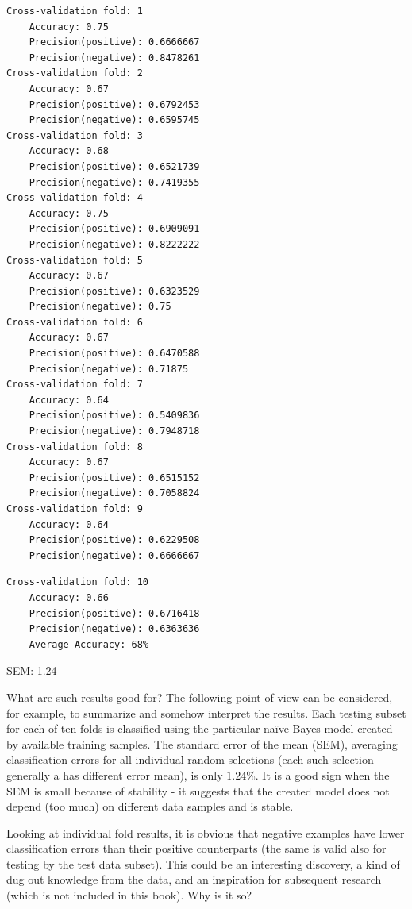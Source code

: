 \documentclass[11pt,openany,executivepaper]{book}
\begin{document}
\begin{verbatim}
Cross-validation fold: 1
    Accuracy: 0.75
    Precision(positive): 0.6666667
    Precision(negative): 0.8478261
Cross-validation fold: 2
    Accuracy: 0.67
    Precision(positive): 0.6792453
    Precision(negative): 0.6595745
Cross-validation fold: 3
    Accuracy: 0.68
    Precision(positive): 0.6521739
    Precision(negative): 0.7419355
Cross-validation fold: 4
    Accuracy: 0.75
    Precision(positive): 0.6909091
    Precision(negative): 0.8222222
Cross-validation fold: 5
    Accuracy: 0.67
    Precision(positive): 0.6323529
    Precision(negative): 0.75
Cross-validation fold: 6
    Accuracy: 0.67
    Precision(positive): 0.6470588
    Precision(negative): 0.71875
Cross-validation fold: 7
    Accuracy: 0.64
    Precision(positive): 0.5409836
    Precision(negative): 0.7948718
Cross-validation fold: 8
    Accuracy: 0.67
    Precision(positive): 0.6515152
    Precision(negative): 0.7058824
Cross-validation fold: 9
    Accuracy: 0.64
    Precision(positive): 0.6229508
    Precision(negative): 0.6666667
\end{verbatim}

\begin{verbatim}
Cross-validation fold: 10
    Accuracy: 0.66
    Precision(positive): 0.6716418
    Precision(negative): 0.6363636
    Average Accuracy: 68%
\end{verbatim}

SEM: 1.24

What are such results good for? The following point of view can be considered, for example, to summarize and somehow interpret the results. Each testing subset for each of ten folds is classified using the particular naïve Bayes model created by available training samples. The standard error of the mean (SEM), averaging classification errors for all individual random selections (each such selection generally a has different error mean), is only $1.24 \%$. It is a good sign when the SEM is small because of stability - it suggests that the created model does not depend (too much) on different data samples and is stable.

Looking at individual fold results, it is obvious that negative examples have lower classification errors than their positive counterparts (the same is valid also for testing by the test data subset). This could be an interesting discovery, a kind of dug out knowledge from the data, and an inspiration for subsequent research (which is not included in this book). Why is it so?
\end{document}
